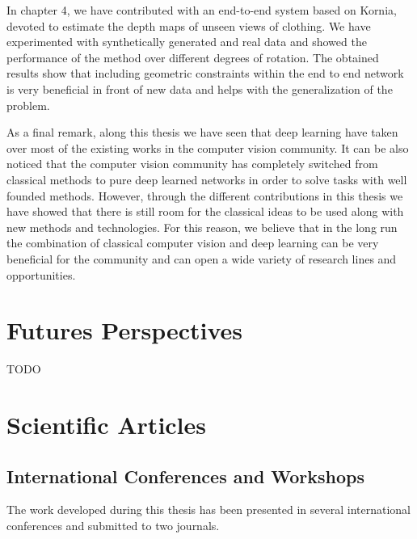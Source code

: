 In chapter 4, we have contributed with an end-to-end system based on Kornia, devoted to estimate the depth maps of unseen views of clothing. We have experimented with synthetically generated and real data and showed the performance of the method over different degrees of rotation. The obtained results show that including geometric constraints within the end to end network is very beneficial in front of new data and helps with the generalization of the problem.

As a final remark, along this thesis we have seen that deep learning have taken over most of the existing works in the computer vision community. It can be also noticed that the computer vision community has completely switched from classical methods to pure deep learned networks in order to solve tasks with well founded methods. However, through the different contributions in this thesis we have showed that there is still room for the classical ideas to be used along with new methods and technologies. For this reason, we believe that in the long run the combination of classical computer vision and deep learning can be very beneficial for the community and can open a wide variety of research lines and opportunities.

\section{Futures Perspectives}

TODO

\section{Scientific Articles}

\subsection{International Conferences and Workshops}

The work developed during this thesis has been presented in several international conferences and submitted to two journals.

